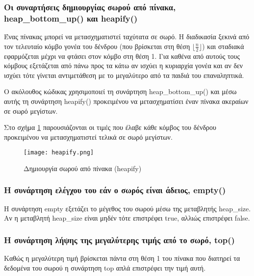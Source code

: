 

\subsubsection*{Οι συναρτήσεις δημιουργίας σωρού από πίνακα, heap\_bottom\_up() και heapify()}
Ένας πίνακας μπορεί να μετασχηματιστεί ταχύτατα σε σωρό. Η διαδικασία ξεκινά από τον τελευταίο κόμβο γονέα του δένδρου (που βρίσκεται στη θέση $\lfloor{\frac{n}{2}}\rfloor$) και σταδιακά εφαρμόζεται μέχρι να φτάσει στον κόμβο στη θέση 1. Για καθένα από αυτούς τους κόμβους εξετάζεται από πάνω προς τα κάτω αν ισχύει η κυριαρχία γονέα και αν δεν ισχύει τότε γίνεται αντιμετάθεση με το μεγαλύτερο από τα παιδιά του επαναληπτικά. 

Ο ακόλουθος κώδικας χρησιμοποιεί τη συνάρτηση heap\_bottom\_up() και μέσω αυτής τη συνάρτηση heapify() προκειμένου να μετασχηματίσει έναν πίνακα ακεραίων σε σωρό μεγίστων. 




Στο σχήμα \ref{fig:heapify} παρουσιάζονται οι τιμές που έλαβε κάθε κόμβος του δένδρου προκειμένου να μετασχηματιστεί τελικά σε σωρό μεγίστων.

\begin{figure}[ht]
\centering
\texttt{[image: heapify.png]}
\caption{Δημιουργία σωρού από πίνακα (heapify)}
\label{fig:heapify}
\end{figure}

\subsubsection*{Η συνάρτηση ελέγχου του εάν ο σωρός είναι άδειος, empty()}
Η συνάρτηση empty εξετάζει το μέγεθος του σωρού μέσω της μεταβλητής heap\_size. Αν η μεταβλητή heap\_size είναι μηδέν τότε επιστρέφει true, αλλιώς επιστρέφει false.

\subsubsection*{Η συνάρτηση λήψης της μεγαλύτερης τιμής από το σωρό, top()}
Καθώς η μεγαλύτερη τιμή βρίσκεται πάντα στη θέση 1 του πίνακα που διατηρεί τα δεδομένα του σωρού η συνάρτηση top απλά επιστρέφει την τιμή αυτή.

